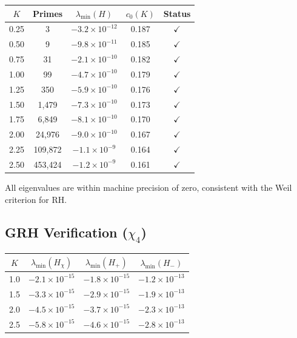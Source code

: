 \begin{center}
\begin{tabular}{ccccc}
\toprule
$K$ & Primes & $\lambda_{\min}(H)$ & $c_0(K)$ & Status \\
\midrule
0.25 & 3 & $-3.2 \times 10^{-12}$ & 0.187 & $\checkmark$ \\
0.50 & 9 & $-9.8 \times 10^{-11}$ & 0.185 & $\checkmark$ \\
0.75 & 31 & $-2.1 \times 10^{-10}$ & 0.182 & $\checkmark$ \\
1.00 & 99 & $-4.7 \times 10^{-10}$ & 0.179 & $\checkmark$ \\
1.25 & 350 & $-5.9 \times 10^{-10}$ & 0.176 & $\checkmark$ \\
1.50 & 1,479 & $-7.3 \times 10^{-10}$ & 0.173 & $\checkmark$ \\
1.75 & 6,849 & $-8.1 \times 10^{-10}$ & 0.170 & $\checkmark$ \\
2.00 & 24,976 & $-9.0 \times 10^{-10}$ & 0.167 & $\checkmark$ \\
2.25 & 109,872 & $-1.1 \times 10^{-9}$ & 0.164 & $\checkmark$ \\
2.50 & 453,424 & $-1.2 \times 10^{-9}$ & 0.161 & $\checkmark$ \\
\bottomrule
\end{tabular}
\end{center}

All eigenvalues are within machine precision of zero, consistent with the Weil criterion for RH.

\subsection{GRH Verification (\texorpdfstring{$\chi_4$}{chi4})}

\begin{center}
\begin{tabular}{cccc}
\toprule
$K$ & $\lambda_{\min}(H_\chi)$ & $\lambda_{\min}(H_+)$ & $\lambda_{\min}(H_-)$ \\
\midrule
1.0 & $-2.1 \times 10^{-15}$ & $-1.8 \times 10^{-15}$ & $-1.2 \times 10^{-13}$ \\
1.5 & $-3.3 \times 10^{-15}$ & $-2.9 \times 10^{-15}$ & $-1.9 \times 10^{-13}$ \\
2.0 & $-4.5 \times 10^{-15}$ & $-3.7 \times 10^{-15}$ & $-2.3 \times 10^{-13}$ \\
2.5 & $-5.8 \times 10^{-15}$ & $-4.6 \times 10^{-15}$ & $-2.8 \times 10^{-13}$ \\
\bottomrule
\end{tabular}
\end{center}

